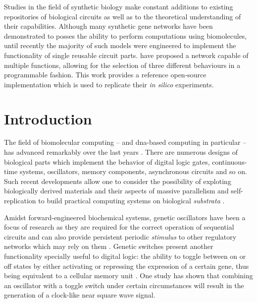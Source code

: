 
  \noindent Studies in the field of synthetic biology make constant additions to existing repositories of biological circuits as well as to the theoretical understanding of their capabilities.
  Although many synthetic gene networks have been demonstrated to posses the ability to perform computations using biomolecules, until recently the majority of such models were engineered to implement the functionality of single reusable circuit parts.
  \citet{originals} have proposed a network capable of multiple functions, allowing for the selection of three different behaviours in a programmable fashion.
  This work provides a reference open-source implementation which is used to replicate their \textit{in silico} experiments.


\section{Introduction}

  The field of biomolecular computing -- and \acs{dna}-based computing in particular -- has advanced remarkably over the last years \cite{analog}.
  There are numerous designs of biological parts which implement the behavior of digital logic gates\supercite{async}, continuous-time systems\supercite{analog}, oscillators\supercite{repressilator}, memory components\supercite{async}, asynchronous circuits\supercite{async} and so on.
  Such recent developments allow one to consider the possibility of exploting biologically derived materials and their aspects of massive parallelism and self-replication to build practical computing systems on biological \textit{substrata} \cite{youtuber}.

  Amidst forward-engineered biochemical systems, genetic oscillators have been a focus of research as they are required for the correct operation of sequential circuits and can also provide persistent periodic \textit{stimulus} to other regulatory networks which may rely on them \cite{ingalls}.
  Genetic switches present another functionality specially useful to digital logic: the ability to toggle between on or off states by either activating or repressing the expression of a certain gene, thus being equivalent to a cellular memory unit \cite{youtuber}.
  One study\supercite{clock} has shown that combining an oscillator with a toggle switch under certain circumstances will result in the generation of a clock-like near square wave signal.

